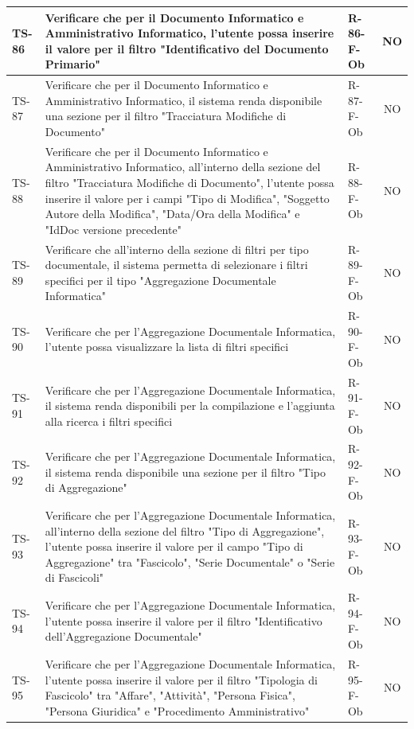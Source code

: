 \documentclass[a4paper,12pt]{article}
\begin{document}
\begin{longtable}{|p{1.5cm}|p{8.3cm}|p{2.4cm}|c|}
\hline
TS-86 & Verificare che per il Documento Informatico e Amministrativo Informatico, l'utente possa inserire il valore per il filtro "Identificativo del Documento Primario" & R-86-F-Ob & NO \\
\hline
TS-87 & Verificare che per il Documento Informatico e Amministrativo Informatico, il sistema renda disponibile una sezione per il filtro "Tracciatura Modifiche di Documento" & R-87-F-Ob & NO \\
\hline
TS-88 & Verificare che per il Documento Informatico e Amministrativo Informatico, all'interno della sezione del filtro "Tracciatura Modifiche di Documento", l'utente possa inserire il valore per i campi "Tipo di Modifica", "Soggetto Autore della Modifica", "Data/Ora della Modifica" e "IdDoc versione precedente" & R-88-F-Ob & NO \\
\hline
TS-89 & Verificare che all'interno della sezione di filtri per tipo documentale, il sistema permetta di selezionare i filtri specifici per il tipo "Aggregazione Documentale Informatica" & R-89-F-Ob & NO \\
\hline
TS-90 & Verificare che per l'Aggregazione Documentale Informatica, l'utente possa visualizzare la lista di filtri specifici & R-90-F-Ob & NO \\
\hline
TS-91 & Verificare che per l'Aggregazione Documentale Informatica, il sistema renda disponibili per la compilazione e l'aggiunta alla ricerca i filtri specifici & R-91-F-Ob  & NO \\
\hline
TS-92 & Verificare che per l'Aggregazione Documentale Informatica, il sistema renda disponibile una sezione per il filtro "Tipo di Aggregazione" & R-92-F-Ob & NO \\
\hline
TS-93 & Verificare che per l'Aggregazione Documentale Informatica, all'interno della sezione del filtro "Tipo di Aggregazione", l'utente possa inserire il valore per il campo "Tipo di Aggregazione" tra "Fascicolo", "Serie Documentale" o "Serie di Fascicoli" & R-93-F-Ob & NO \\
\hline
TS-94 & Verificare che per l'Aggregazione Documentale Informatica, l'utente possa inserire il valore per il filtro "Identificativo dell'Aggregazione Documentale" & R-94-F-Ob & NO \\
\hline
TS-95 & Verificare che per l'Aggregazione Documentale Informatica, l'utente possa inserire il valore per il filtro "Tipologia di Fascicolo" tra "Affare", "Attività", "Persona Fisica", "Persona Giuridica" e "Procedimento Amministrativo" & R-95-F-Ob & NO \\

\end{longtable}
\end{document}
